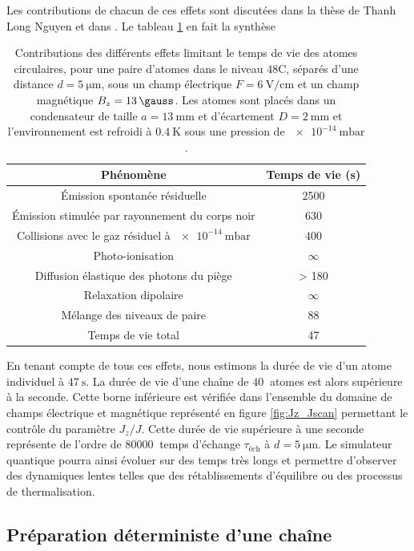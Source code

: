 Les contributions de chacun de ces effets sont discutées dans la thèse de Thanh Long Nguyen \cite{PHD_NGUYEN} et dans \cite{ENS_PRE_CIRCSIM}.
Le tableau \ref{tab:lifetime_circsim} en fait la synthèse
%
\begin{table}[!h]
	\centering
	\caption[Contributions des différents effets limitant le temps de vie des atomes circulaires]{Contributions des différents effets limitant le temps de vie des atomes circulaires, pour une paire d'atomes dans le niveau $\mathrm{48C}$, séparés d'une distance $d=\SI{5}{\um}$, sous un champ électrique $F=\SI{6}{\V/\cm}$ et un champ magnétique $B_z=\SI{13}{\gauss}$.
	Les atomes sont placés dans un condensateur de taille $a=\SI{13}{\mm}$ et d'écartement $D=\SI{2}{\mm}$ et l'environnement est refroidi à $\SI{0.4}{\K}$ sous une pression de $\SI{e-14}{\milli\bar}$.
	}
	\label{tab:lifetime_circsim}
	\begin{tabular}{c c}
		\toprule\midrule
		Phénomène
		& Temps de vie (\si{\second})\\
		\midrule
		Émission spontanée résiduelle & \SI{2500}{} \\
		Émission stimulée par rayonnement du corps noir & \SI{630}{} \\
		Collisions avec le gaz résiduel à $\SI{e-14}{\milli\bar}$ & \SI{400}{} \\
		Photo-ionisation & $\infty$ \\
		Diffusion élastique des photons du piège & \SI{> 180}{} \\
		Relaxation dipolaire & $\infty$ \\
		Mélange des niveaux de paire & \SI{88}{} \\
		\midrule \midrule
		Temps de vie total & 47 \\
		\midrule \bottomrule
 	\end{tabular}
\end{table}
%
En tenant compte de tous ces effets, nous estimons la durée de vie d'un atome individuel à $\SI{47}{\second}$.
La durée de vie d'une chaîne de $\SI{40}{}$ atomes est alors supérieure à la seconde.
Cette borne inférieure est vérifiée dans l'ensemble du domaine de champs électrique et magnétique représenté en figure \ref{fig:Jz_Jscan} permettant le contrôle du paramètre $J_z/J$.
Cette durée de vie supérieure à une seconde représente de l'ordre de $\SI{80000}{}$ temps d'échange $\tau_{\text{éch}}$ à $d=\SI{5}{\um}$.
Le simulateur quantique pourra ainsi évoluer sur des temps très longs et permettre d'observer des dynamiques lentes telles que des rétablissements d'équilibre ou des processus de thermalisation.

	\subsection{Préparation déterministe d'une chaîne}\label{subsec:vdW_evap}
